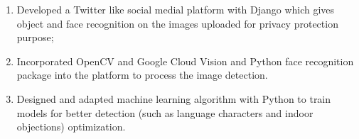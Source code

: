 \begin{enumerate}

\item{
 Developed a Twitter like social medial platform with Django which gives object and face recognition on the images uploaded for privacy protection purpose;}
 
\item{Incorporated OpenCV and Google Cloud Vision and Python face recognition package into the platform to process the image detection.}

\item{Designed and adapted machine learning algorithm with Python to train models for better detection (such as language characters and indoor objections) optimization.} 
 
 
 \end{enumerate}